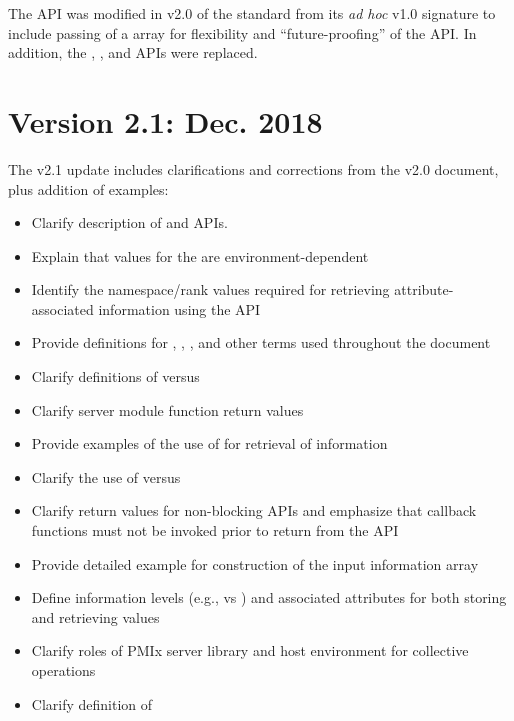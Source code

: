 The  \ac{API} was modified in v2.0 of the standard from its \textit{ad hoc} v1.0 signature to include passing of a  array for flexibility and ``future-proofing'' of the \ac{API}.
In addition, the , , and  \acp{API} were replaced.

\section{Version 2.1: Dec. 2018}

The v2.1 update includes clarifications and corrections from the v2.0 document, plus addition of examples:

\begin{itemize}
    \item Clarify description of  and  \acp{API}.
    \item Explain that values for the  are environment-dependent
    \item Identify the namespace/rank values required for retrieving attribute-associated information using the  \ac{API}
    \item Provide definitions for , , , and other terms used throughout the document
    \item Clarify definitions of  versus 
    \item Clarify server module function return values
    \item Provide examples of the use of  for retrieval of information
    \item Clarify the use of  versus 
    \item Clarify return values for non-blocking \acp{API} and emphasize that callback functions must not be invoked prior to return from the \ac{API}
    \item Provide detailed example for construction of the  input information array
    \item Define information levels (e.g.,  vs ) and associated attributes for both storing and retrieving values
    \item Clarify roles of \ac{PMIx} server library and host environment for collective operations
    \item Clarify definition of 
\end{itemize}

